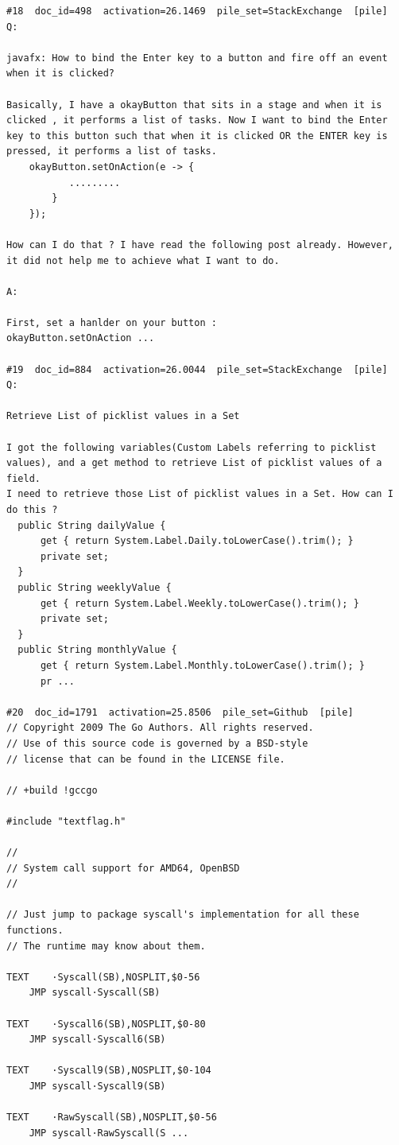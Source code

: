 \begin{verbatim}
#18  doc_id=498  activation=26.1469  pile_set=StackExchange  [pile]
Q:

javafx: How to bind the Enter key to a button and fire off an event when it is clicked?

Basically, I have a okayButton that sits in a stage and when it is clicked , it performs a list of tasks. Now I want to bind the Enter key to this button such that when it is clicked OR the ENTER key is pressed, it performs a list of tasks. 
    okayButton.setOnAction(e -> {       
           .........
        }
    });

How can I do that ? I have read the following post already. However, it did not help me to achieve what I want to do. 

A:

First, set a hanlder on your button :
okayButton.setOnAction ...

#19  doc_id=884  activation=26.0044  pile_set=StackExchange  [pile]
Q:

Retrieve List of picklist values in a Set

I got the following variables(Custom Labels referring to picklist values), and a get method to retrieve List of picklist values of a field.
I need to retrieve those List of picklist values in a Set. How can I do this ?
  public String dailyValue {
      get { return System.Label.Daily.toLowerCase().trim(); } 
      private set;
  }
  public String weeklyValue {
      get { return System.Label.Weekly.toLowerCase().trim(); }
      private set;
  }
  public String monthlyValue {
      get { return System.Label.Monthly.toLowerCase().trim(); }
      pr ...

#20  doc_id=1791  activation=25.8506  pile_set=Github  [pile]
// Copyright 2009 The Go Authors. All rights reserved.
// Use of this source code is governed by a BSD-style
// license that can be found in the LICENSE file.

// +build !gccgo

#include "textflag.h"

//
// System call support for AMD64, OpenBSD
//

// Just jump to package syscall's implementation for all these functions.
// The runtime may know about them.

TEXT	·Syscall(SB),NOSPLIT,$0-56
	JMP	syscall·Syscall(SB)

TEXT	·Syscall6(SB),NOSPLIT,$0-80
	JMP	syscall·Syscall6(SB)

TEXT	·Syscall9(SB),NOSPLIT,$0-104
	JMP	syscall·Syscall9(SB)

TEXT	·RawSyscall(SB),NOSPLIT,$0-56
	JMP	syscall·RawSyscall(S ...

\end{verbatim}

